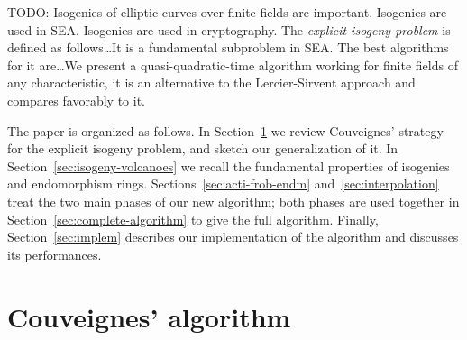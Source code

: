 \documentclass{article}
\newcommand{\todo}[1]{{\color{red}TODO: #1}}
\theoremstyle{plain}
\theoremstyle{definition}
\theoremstyle{remark}
\begin{document}
\todo{Isogenies of elliptic curves over finite fields are
  important. Isogenies are used in SEA. Isogenies are used in
  cryptography.  The \emph{explicit isogeny problem} is defined as
  follows\dots It is a fundamental subproblem in SEA. The best
  algorithms for it are\dots We present a quasi-quadratic-time
  algorithm working for finite fields of any characteristic, it is an
  alternative to the Lercier-Sirvent approach and compares favorably
  to it.}








The paper is organized as follows. In Section~\ref{sec:couv-algor} we
review Couveignes' strategy for the explicit isogeny problem, and
sketch our generalization of it. In
Section~\ref{sec:isogeny-volcanoes} we recall the fundamental
properties of isogenies and endomorphism
rings. Sections~\ref{sec:acti-frob-endm} and~\ref{sec:interpolation}
treat the two main phases of our new algorithm; both phases are used
together in Section~\ref{sec:complete-algorithm} to give the full
algorithm. Finally, Section~\ref{sec:implem} describes our
implementation of the algorithm and discusses its performances.



\section{Couveignes' algorithm}
\label{sec:couv-algor}
\end{document}
